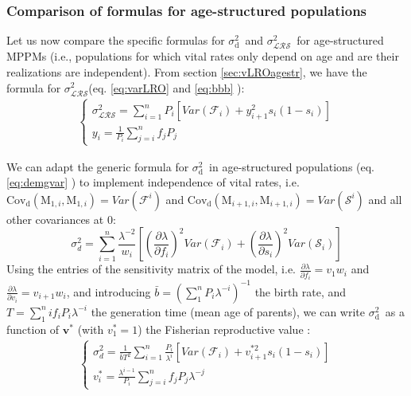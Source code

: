 \documentclass[10pt,a4paper]{article}
\newcommand{\vLRO}{$\sigma_{\mathrm{\mathcal{LRS}}}^2$}
\newcommand{\vd}{$\sigma_{\mathrm{d}}^2$}
\begin{document}
\subsubsection*{Comparison of formulas for age-structured populations}
Let us now compare the specific formulas for \vd\ and \vLRO\ for age-structured MPPMs (i.e., populations for which vital rates only depend on age and are their realizations are independent). From section \ref{sec:vLROagestr}, we have the formula for \vLRO (eq. \ref{eq:varLRO} and \ref{eq:bbb} ):
\begin{eqnarray} \left\{ \begin{array}{l}
\sigma_{\mathcal{LRS}}^{2}=\sum_{i=1}^{n} P_{i}\left[ Var(\mathcal{F}_{i}) +y_{i+1}^{2}s_{i}(1-s_{i})\right] \\
y_i= \frac{1}{P_{i}} \sum_{j=i}^{n} f_{j}P_{j}
\label{eq:prout111}
\end{array} \right.
\end{eqnarray}

We can adapt the generic formula for \vd\ in age-structured populations (eq. \ref{eq:demgvar} ) to implement independence of vital rates, i.e. $\mathrm{Cov_d}(\mathrm{M}_{1,i},\mathrm{M}_{1,i})=Var(\mathcal{F}^{i})$ and $\mathrm{Cov_d}(\mathrm{M}_{i+1,i},\mathrm{M}_{i+1,i})=Var(\mathcal{S}^{i})$ and all other covariances at 0: 
\[\sigma_{d}^{2}=\sum_{i=1}^{n} \frac{\lambda^{-2}}{w_i}\left[ (\frac{\partial \lambda}{\partial f_i})^{2}Var(\mathcal{F}_{i}) + (\frac{\partial \lambda}{\partial s_i})^{2}Var(\mathcal{S}_{i})\right]  \]
Using the entries of the sensitivity matrix of the model, i.e.  $\frac{\partial \lambda}{\partial f_i}=v_{1}w_{i}$ and $\frac{\partial \lambda}{\partial v_i}=v_{i+1}w_{i}$, and introducing $\bar{b}=(\sum_1^{n}P_{i}\lambda^{-i})^{-1}$  the birth rate, and $T=\sum_{1}^{n}if_{i}P_{i}\lambda^{-i}$ the generation time (mean age of parents), we can write \vd\ as a function of $\bm{v^{*}}$ (with $v^{*}_{1}=1$) the Fisherian reproductive value   :
\begin{eqnarray} \left\{ \begin{array}{l}
\sigma_{d}^{2}=\frac{1}{\bar{b}T^2} \sum_{i=1}^{n} \frac{P_{i}}{\lambda^{i}} \left[Var(\mathcal{F}_{i})+ v_{i+1}^{*2}s_{i}(1-s_{i})   \right] \\
v^{*}_{i}=\frac{\lambda^{i-1}}{P_{i}}\sum_{j=i}^{n}f_{j}P_{j}\lambda^{-j} 
\label{eq:prout222}
\end{array} \right.
\end{eqnarray}
\citep{Engen2005}\\
\end{document}
